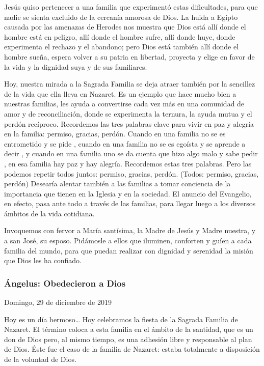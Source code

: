 \begin{body}
\begin{body}
Jesús quiso pertenecer a una familia que experimentó estas dificultades, para que nadie se sienta excluido de la cercanía amorosa de Dios. La huida a Egipto causada por las amenazas de Herodes nos muestra que Dios está allí donde el hombre está en peligro, allí donde el hombre sufre, allí donde huye, donde experimenta el rechazo y el abandono; pero Dios está también allí donde el hombre sueña, espera volver a su patria en libertad, proyecta y elige en favor de la vida y la dignidad suya y de sus familiares.

Hoy, nuestra mirada a la Sagrada Familia se deja atraer también por la sencillez de la vida que ella lleva en Nazaret. Es un ejemplo que hace mucho bien a nuestras familias, les ayuda a convertirse cada vez más en una comunidad de amor y de reconciliación, donde se experimenta la ternura, la ayuda mutua y el perdón recíproco. Recordemos las tres palabras clave para vivir en paz y alegría en la familia: permiso, gracias, perdón. Cuando en una familia no se es entrometido y se pide , cuando en una familia no se es egoísta y se aprende a decir , y cuando en una familia uno se da cuenta que hizo algo malo y sabe pedir , en esa familia hay paz y hay alegría. Recordemos estas tres palabras. Pero las podemos repetir todos juntos: permiso, gracias, perdón. (Todos: permiso, gracias, perdón) Desearía alentar también a las familias a tomar conciencia de la importancia que tienen en la Iglesia y en la sociedad. El anuncio del Evangelio, en efecto, pasa ante todo a través de las familias, para llegar luego a los diversos ámbitos de la vida cotidiana.

Invoquemos con fervor a María santísima, la Madre de Jesús y Madre nuestra, y a san José, su esposo. Pidámosle a ellos que iluminen, conforten y guíen a cada familia del mundo, para que puedan realizar con dignidad y serenidad la misión que Dios les ha confiado.

\subsubsection{Ángelus: Obedecieron a Dios}

Domingo, 29 de diciembre de 2019

Hoy es un día hermoso\ldots{} Hoy celebramos la fiesta de la Sagrada Familia de Nazaret. El término  coloca a esta familia en el ámbito de la santidad, que es un don de Dios pero, al mismo tiempo, es una adhesión libre y responsable al plan de Dios. Éste fue el caso de la familia de Nazaret: estaba totalmente a disposición de la voluntad de Dios.


\end{body}
\end{body}
